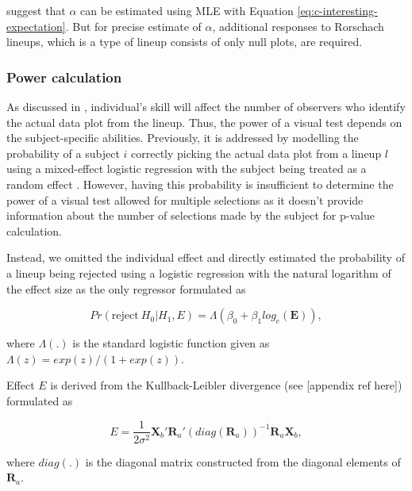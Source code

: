 \documentclass[]{interact}
\theoremstyle{plain}%
\theoremstyle{definition}
\theoremstyle{remark}
\begin{document}
\citet{vanderplas2021statistical} suggest that \(\alpha\) can be
estimated using MLE with Equation \ref{eq:c-interesting-expectation}.
But for precise estimate of \(\alpha\), additional responses to
Rorschach lineups, which is a type of lineup consists of only null
plots, are required.

\hypertarget{power-calculation}{%
\subsubsection{Power calculation}\label{power-calculation}}

As discussed in \citet{majumder_validation_2013}, individual's skill
will affect the number of observers who identify the actual data plot
from the lineup. Thus, the power of a visual test depends on the
subject-specific abilities. Previously, it is addressed by modelling the
probability of a subject \(i\) correctly picking the actual data plot
from a lineup \(l\) using a mixed-effect logistic regression with the
subject being treated as a random effect
\citep{majumder_validation_2013}. However, having this probability is
insufficient to determine the power of a visual test allowed for
multiple selections as it doesn't provide information about the number
of selections made by the subject for p-value calculation.

Instead, we omitted the individual effect and directly estimated the
probability of a lineup being rejected using a logistic regression with
the natural logarithm of the effect size as the only regressor
formulated as

\begin{equation} \label{eq:logistic-regression-1-1}
Pr(\text{reject}~H_0|H_1,E) = \Lambda(\beta_0 + \beta_1 log_e(\boldsymbol{E})),
\end{equation}

\noindent where \(\Lambda(.)\) is the standard logistic function given
as \(\Lambda(z) = exp(z)/(1+exp(z))\).

Effect \(E\) is derived from the Kullback-Leibler divergence (see
{[}appendix ref here{]}) formulated as

\begin{equation} \label{eq:effect-size-ex1}
E = \frac{1}{2\sigma^2}\boldsymbol{X}_b'\boldsymbol{R}_a'(diag(\boldsymbol{R}_a))^{-1}\boldsymbol{R}_a\boldsymbol{X}_b,
\end{equation}

\noindent where \(diag(.)\) is the diagonal matrix constructed from the
diagonal elements of \(\boldsymbol{R}_a\).
\end{document}

